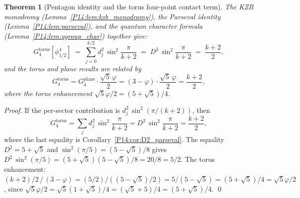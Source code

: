 \documentclass[11pt,a4paper]{article}
\newtheorem{theorem}{Theorem}[section]
\theoremstyle{definition}
\theoremstyle{remark}
\newcommand{\vp}{\varphi}
\begin{document}
\begin{theorem}[Pentagon identity and the torus four-point contact term]
\label{P14:thm:pentagon_g4}
The KZB monodromy (Lemma~\ref{P14:lem:kzb_monodromy}), the Parseval
identity (Lemma~\ref{P14:lem:parseval}), and the quantum character formula
(Lemma~\ref{P14:lem:qgroup_char}) together give:
\begin{equation}
  \boxed{G_4^{\mathrm{torus}}[\phi_{1/2}^4]
  \;=\; \sum_{j=0}^{k/2} d_j^2\,\sin^2\!\frac{\pi}{k+2}
  \;=\; D^2\,\sin^2\!\frac{\pi}{k+2}
  \;=\; \frac{k+2}{2},}
  \label{P14:eq:G4_pentagon}
\end{equation}
and the torus and plane results are related by
\begin{equation}
  G_4^{\mathrm{torus}} = G_4^{\mathrm{plane}}\cdot\frac{\sqrt{5}\,\vp}{2}
  = (3-\vp)\cdot\frac{\sqrt{5}\,\vp}{2} = \frac{k+2}{2},
  \label{P14:eq:G4_enhancement}
\end{equation}
where the torus enhancement $\sqrt{5}\vp/2 = (5+\sqrt{5})/4$.
\end{theorem}

\begin{proof}
If the per-sector contribution is $d_j^2\,\sin^2(\pi/(k+2))$, then
\begin{equation}
  G_4^{\mathrm{torus}} = \sum_j d_j^2\,\sin^2\!\frac{\pi}{k+2}
  = D^2\,\sin^2\!\frac{\pi}{k+2} = \frac{k+2}{2},
  \label{P14:eq:pentagon_sum}
\end{equation}
where the last equality is Corollary~\ref{P14:cor:D2_parseval}.
The equality $D^2 = 5+\sqrt{5}$ and $\sin^2(\pi/5)=(5-\sqrt{5})/8$ gives
$D^2\,\sin^2(\pi/5) = (5+\sqrt{5})(5-\sqrt{5})/8 = 20/8 = 5/2$.
The torus enhancement: $(k+2)/2\,/\,(3-\vp) = (5/2)/((5-\sqrt{5})/2)
= 5/(5-\sqrt{5}) = (5+\sqrt{5})/4 = \sqrt{5}\vp/2$, since
$\sqrt{5}\vp/2 = \sqrt{5}(1+\sqrt{5})/4 = (\sqrt{5}+5)/4 = (5+\sqrt{5})/4$.
\qed
\end{proof}
\end{document}
